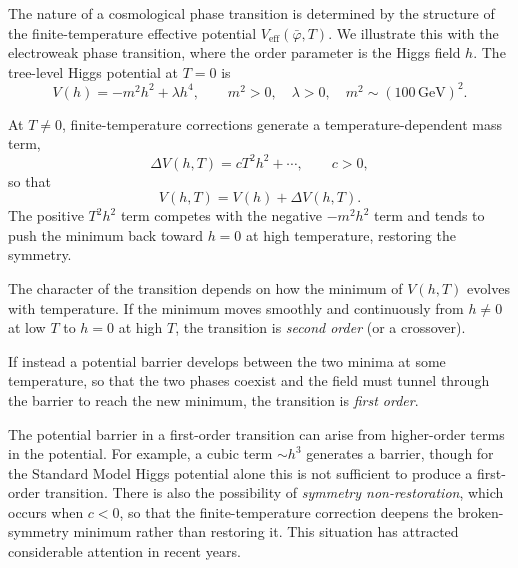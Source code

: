 The nature of a cosmological phase transition is determined by the
structure of the finite-temperature effective potential
$V_{\text{eff}}(\bar\varphi, T)$. We illustrate this with the
electroweak phase transition, where the order parameter is the Higgs
field $h$. The tree-level Higgs potential at $T=0$ is
\begin{equation}
	V(h) = -m^2 h^2 + \lambda h^4,
	\qquad m^2 > 0,\quad \lambda > 0,\quad
	m^2\sim(100\,\text{GeV})^2.
\end{equation}


At $T\neq 0$, finite-temperature corrections generate a
temperature-dependent mass term,
\begin{equation}
	\Delta V(h,T) = cT^2 h^2 + \cdots,\qquad c > 0,
\end{equation}
so that
\begin{equation}
	V(h,T) = V(h) + \Delta V(h,T).
\end{equation}
The positive $T^2 h^2$ term competes with the negative $-m^2 h^2$ term
and tends to push the minimum back toward $h=0$ at high temperature,
restoring the symmetry.

The character of the transition depends on how the minimum of
$V(h,T)$ evolves with temperature. If the minimum moves smoothly and
continuously from $h\neq 0$ at low $T$ to $h=0$ at high $T$, the
transition is \emph{second order} (or a crossover).


If instead a potential barrier develops between the two minima at some
temperature, so that the two phases coexist and the field must tunnel
through the barrier to reach the new minimum, the transition is
\emph{first order}.


The potential barrier in a first-order transition can arise from
higher-order terms in the potential. For example, a cubic term $\sim h^3$
generates a barrier, though for the Standard Model Higgs potential alone
this is not sufficient to produce a first-order transition. There is
also the possibility of \emph{symmetry non-restoration}, which occurs
when $c < 0$, so that the finite-temperature correction deepens the
broken-symmetry minimum rather than restoring it. This situation has
attracted considerable attention in recent years.

